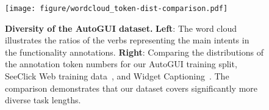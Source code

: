 \begin{figure}[t]
    \centering
    \texttt{[image: figure/wordcloud\_token-dist-comparison.pdf]}
    \caption{\textbf{Diversity of the AutoGUI dataset.} \textbf{Left}: The word cloud illustrates the ratios of the verbs representing the main intents in the functionality annotations. \textbf{Right}: Comparing the distributions of the annotation token numbers for our AutoGUI training split, SeeClick Web training data~\citep{cheng2024seeclick}, and Widget Captioning~\citep{Li2020WidgetCG}. The comparison demonstrates that our dataset covers significantly more diverse task lengths.}
    \label{fig: wordcloud and tokdistrib}
\end{figure}
\vspace{-2mm}
